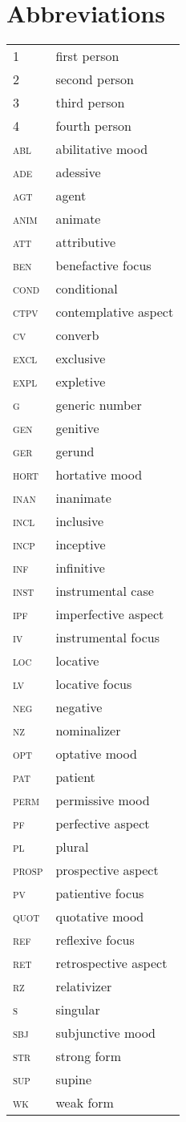 \chapter*{Abbreviations}

	\begin{longtabu} to 0.8
		1		& first person\\
		2		& second person\\
		3		& third person\\
		4		& fourth person\\
		abl		& abilitative mood\\
		ade		& adessive\\
		agt		& agent\\
		anim	& animate\\
		att		& attributive\\
		ben		& benefactive focus\\
		cond	& conditional\\
		ctpv	& contemplative aspect\\
		cv		& converb\\
		excl	& exclusive\\
		expl	& expletive\\
		g		& generic number\\
		gen 	& genitive\\
		ger		& gerund\\
		hort	& hortative mood\\
		inan	& inanimate\\
		incl	& inclusive\\
		incp	& inceptive\\
		inf		& infinitive\\
		inst	& instrumental case\\
		ipf		& imperfective aspect\\
		iv		& instrumental focus\\
		loc		& locative\\
		lv		& locative focus\\
		neg		& negative\\
		nz		& nominalizer\\
		opt		& optative mood\\
		pat		& patient\\
		perm	& permissive mood\\
		pf		& perfective aspect\\
		pl		& plural\\
		prosp	& prospective aspect\\
		pv		& patientive focus\\
		quot	& quotative mood\\
		ref		& reflexive focus\\
		ret		& retrospective aspect\\
		rz		& relativizer\\
		s		& singular\\
		sbj		& subjunctive mood\\
		str		& strong form\\
		sup		& supine\\
		wk		& weak form\\
	\end{longtabu}
